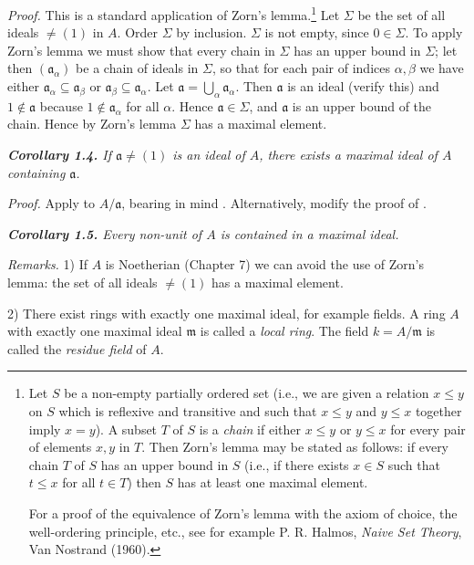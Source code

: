\noindent\emph{Proof.}  This is a standard application of Zorn's lemma.\footnote{Let $S$ be a non-empty partially ordered set (i.e., we are given a relation $x\leq y$ on $S$
which is reflexive and transitive and such that $x\leq y$ and $y\leq x$ together imply
$x=y$).  A subset $T$ of $S$ is a \emph{chain} if either $x\leq y$ or $y\leq x$ for every pair of elements
$x,y$ in $T$.  Then Zorn's lemma may be stated as follows: if every chain $T$ of $S$ has an
upper bound in $S$ (i.e., if there exists $x\in S$ such that $t\leq x$ for all $t\in T$) then $S$ has
at least one maximal element.

For a proof of the equivalence of Zorn's lemma with the axiom of choice, the
well-ordering principle, etc., see for example P. R. Halmos, \emph{Naive Set Theory},
Van Nostrand (1960).} Let $\Sigma$ be the set of all
ideals $\ne(1)$ in $A$.  Order $\Sigma$ by inclusion.  $\Sigma$ is not empty, since $0\in\Sigma$.  To apply
Zorn's lemma we must show that every chain in $\Sigma$ has an upper bound in $\Sigma$;
let then $(\mathfrak a_\alpha)$ be a chain of ideals in $\Sigma$, so that for each pair of indices $\alpha,\beta$ we have
either $\mathfrak a_\alpha\subseteq\mathfrak a_\beta$ or $\mathfrak a_\beta\subseteq\mathfrak a_\alpha$.  Let $\mathfrak a=\bigcup_\alpha\mathfrak a_\alpha$.  Then $\mathfrak a$ is an ideal (verify this) and
$1\notin\mathfrak a$ because $1\notin\mathfrak a_\alpha$ for all $\alpha$.  Hence $\mathfrak a\in\Sigma$, and $\mathfrak a$ is an upper bound of the chain.
Hence by Zorn's lemma $\Sigma$ has a maximal element.\proofbox

\medskip
\noindent\textit{\textbf{Corollary 1.4.} If $\mathfrak a\ne(1)$ is an ideal of $A$, there exists a maximal ideal of $A$
containing $\mathfrak a$.}

\noindent\emph{Proof.}  Apply  to $A/\mathfrak a$, bearing in mind .  Alternatively, modify the
proof of .\proofbox

\medskip
\noindent\textit{\textbf{Corollary 1.5.} Every non-unit of $A$ is contained in a maximal ideal.}\proofbox

\medskip
\noindent\emph{Remarks.}  1) If $A$ is Noetherian (Chapter 7) we can avoid the use of Zorn's
lemma: the set of all ideals $\ne(1)$ has a maximal element.

2) There exist rings with exactly one maximal ideal, for example fields.
A ring $A$ with exactly one maximal ideal $\mathfrak m$ is called a \emph{local ring}.  The field
$k=A/\mathfrak m$ is called the \emph{residue field} of $A$.

